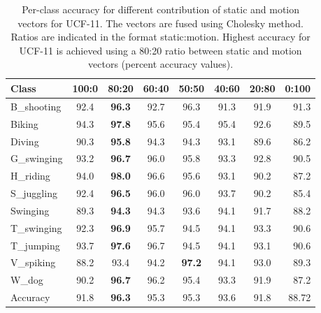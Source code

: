 \begin{table}[]
\centering
\caption{Per-class accuracy for different contribution of static and motion vectors for UCF-11. The vectors are fused using Cholesky method. Ratios are indicated in the
format static:motion. Highest accuracy for UCF-11 is achieved using a
80:20 ratio between static and motion vectors (percent accuracy values).}\label{tbl:rho ucf}
\begin{tabular}{@{} l c c c c c c r @{}}
\toprule
Class           & 100:0  & 80:20     & 60:40   & 50:50    & 40:60     & 20:80   & 0:100 \\ \midrule \midrule
B\_shooting      & 92.4 & \textbf{96.3}   & 92.7  &  96.3  &  91.3   & 91.9  & 91.3  \\
Biking          & 94.3 &  \textbf{97.8}   & 95.6  &  95.4  &  95.4   & 92.6  & 89.5   \\
Diving          & 90.3 &  \textbf{95.8}   & 94.3  &  94.3  &  93.1   &  89.6 & 86.2  \\
G\_swinging      & 93.2 & \textbf{96.7}   &  96.0 &  95.8  &  93.3   &  92.8 & 90.5 \\
H\_riding        & 94.0 &  \textbf{98.0}   &  96.6 &  95.6  &  93.1   &  90.2 & 87.2 \\
S\_juggling      & 92.4&  \textbf{96.5}    & 96.0  &  96.0  &  93.7   &  90.2 & 85.4  \\
Swinging        & 89.3&  \textbf{94.3}    & 94.3  &  93.6  &  94.1   &  91.7 & 88.2 \\
T\_swinging      & 92.3& \textbf{96.9 }    &  95.7 &  94.5  &  94.1   &  93.3 &  90.6 \\
T\_jumping       & 93.7&  \textbf{97.6}    &  96.7 &  94.5  &  94.1   &  93.1 & 90.6 \\
V\_spiking       & 88.2&  93.4    &  94.2 &  \textbf{97.2}  &  94.1   &  93.0 & 89.3 \\
W\_dog           & 90.2&  \textbf{96.7 }   &   96.2&  95.4  &  93.3   &  91.9 & 87.2 \\  \midrule
Accuracy        &   91.8&  \textbf{96.3}    &   95.3&  95.3  &  93.6   & 91.8  & 88.72  \\ \bottomrule
\end{tabular}
\end{table}


